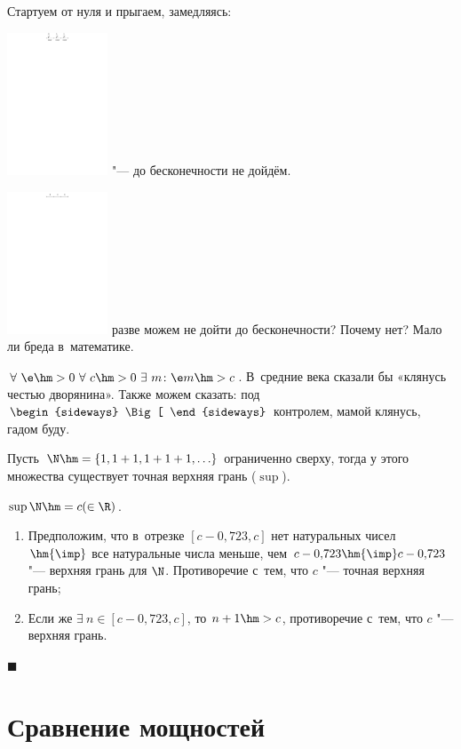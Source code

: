 \documentclass[a4paper,10pt,twoside]{article}
\newenvironment{Proof}
       {\par\noindent{\textbf{Доказательство.}}}
       {\hfill$\scriptstyle\blacksquare$}
\let\AVsection\section{}
\renewcommand\section{\newpage\scol\AVsection}
\newcommand{\scol}{  \renewcommand{\headrulewidth}{0.5pt}\fancyhead[RE,LO]{\thesection{} \leftmark} \fancyhead[LE,RO]{\thepage}}
\begin{document}
Стартуем от нуля и прыгаем, замедляясь:

\includegraphics[width=3cm]{img/final/galat/shag.pdf} "--- до бесконечности не дойдём.

\includegraphics[width=3cm]{img/final/galat/1.pdf} разве можем не дойти до бесконечности? Почему нет? Мало ли бреда в~математике.

$\forall\  \e\hm>0\ \forall\  c\hm>0\ \exists\  m\colon \e m\hm>c$. В~средние века сказали бы «клянусь честью дворянина».
 Также можем сказать: под~$\begin{sideways}
\Big[
\end{sideways}$ контролем, мамой клянусь, гадом буду.

\begin{Proof}
Пусть $\N\hm=\{1,1+1,1+1+1,\ldots\}$ ограниченно сверху, тогда у этого множества существует точная верхняя грань ($\sup$).

$\sup \N\hm=c(\in \R)$.

\begin{enumerate}
    \item Предположим, что в~отрезке $[c-0{,}723,c]$ нет натуральных чисел $\hm{\imp}$ все натуральные числа меньше, чем $c-0{,}723 \hm{\imp} c-0{,}723$ "--- верхняя грань для $\N$. Противоречие с~тем, что $c$ "--- точная верхняя грань;
    \item Если же $\exists\  n\in [c-0{,}723,c]$, то $n+1\hm>c$, противоречие с~тем, что $c$ "--- верхняя грань.
\end{enumerate}
\end{Proof}

\section{Сравнение мощностей}
\end{document}
